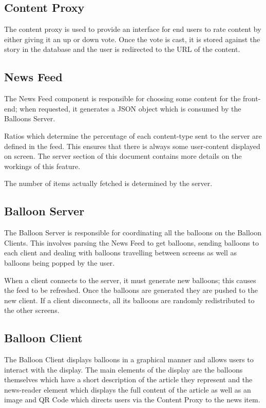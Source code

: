 \subsection{Content Proxy}
The content proxy is used to provide an interface for end users to rate content
by either giving it an up or down vote. Once the vote is cast, it is stored
against the story in the database and the user is redirected to the URL of the
content.

\subsection{News Feed}
The News Feed component is responsible for choosing some content for the
front-end; when requested, it generates a JSON object which is consumed
by the Balloons Server.

Ratios which determine the percentage of each content-type sent to the server
are defined in the feed. This ensures that there is always some user-content
displayed on screen. The server section of this document contains more details
on the workings of this feature.

The number of items actually fetched is determined by the server.


\subsection{Balloon Server}
The Balloon Server is responsible for coordinating all the balloons on the 
Balloon Clients. This involves parsing the News Feed to get balloons, sending
balloons to each client and dealing with balloons travelling between screens 
as well as balloons being popped by the user. 

When a client connects to the server, it must generate new balloons; this 
causes the feed to be refreshed. Once the balloons are generated they are 
pushed to the new client. If a client disconnects, all its balloons are 
randomly redistributed to the other screens.

\subsection{Balloon Client}
The Balloon Client displays balloons in a graphical manner and allows users to
interact with the display. The main elements of the display are the balloons 
themselves which have a short description of the article they represent and the
news-reader element which displays the full content of the article as well as
an image and QR Code which directs users via the Content Proxy to the news item.
